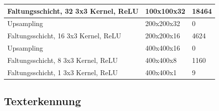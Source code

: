 \begin{table}
\begin{tabular}{|l|l|l|}
        \hline

        Faltungsschicht, 32 3x3 Kernel, ReLU  & 100x100x32                  & 18464                     \\

        \hline

        Upsampling                            & 200x200x32                  & 0                         \\

        \hline

        Faltungsschicht, 16 3x3 Kernel, ReLU  & 200x200x16                  & 4624                      \\

        \hline

        Upsampling                            & 400x400x16                  & 0                         \\

        \hline

        Faltungsschicht, 8 3x3 Kernel, ReLU   & 400x400x8                   & 1160                      \\

        \hline

        Faltungsschicht, 1 3x3 Kernel, ReLU   & 400x400x1                   & 9                         \\

        \hline
    \end{tabular}
\end{table}

\subsection{Texterkennung}
\label{sec:texterkennung}